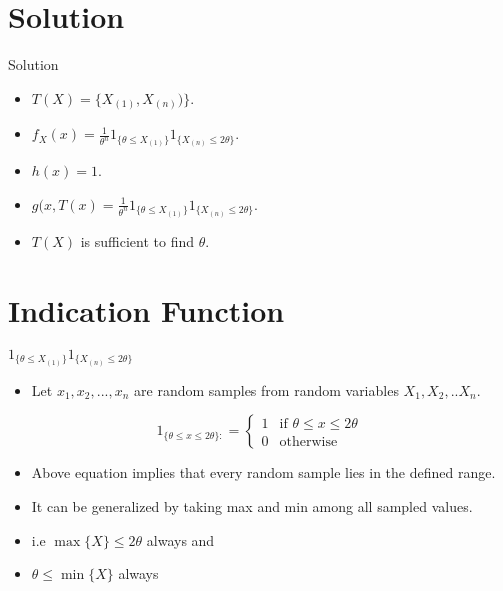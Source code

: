 \documentclass[aspectratio=169,xcolor=dvipsnames]{beamer}
\begin{document}
\section{Solution}

\begin{frame}{Solution}
  \begin{itemize}
      \item $T(X)=\{X_{(1)},X_{(n)})\}$.
      \item $f_X(x)=\frac{1}{\theta^n}1_{\{\theta\leq X_{(1)}\}}1_{\{ X_{(n)}\leq2\theta\}}$.
      \item $h(x)=1$.
      \item $g(x,T(x)=\frac{1}{\theta^n}1_{\{\theta\leq X_{(1)}\}}1_{\{ X_{(n)}\leq2\theta\}}$.
      \item $T(X)$ is sufficient to find $\theta$.
  \end{itemize}
\end{frame}

\section{Indication Function}

\begin{frame}{$1_{\{\theta\leq X_{(1)}\}}1_{\{ X_{(n)}\leq2\theta\}}$}
   \begin{itemize}
       \item Let $x_1,x_2,...,x_n$ are random samples from random variables $X_1,X_2,..X_n$.
   \end{itemize}
   \begin{equation*}
     1_{\{\theta\leq x\leq 2\theta\}:}=
    \begin{cases}
       1 & \text{if $\theta\leq x\leq 2\theta $} \\
       0 & \text{otherwise}
    \end{cases}
   \end{equation*} 
   \begin{itemize}
       \item Above equation implies that every random sample lies in the defined range.
       \item It can be generalized by taking max and min among all sampled values.
       \item i.e $\max\{X\}\leq 2\theta$ always and
       \item $\theta\leq\min\{X\}$ always
   \end{itemize}
    
\end{frame}
\end{document}
